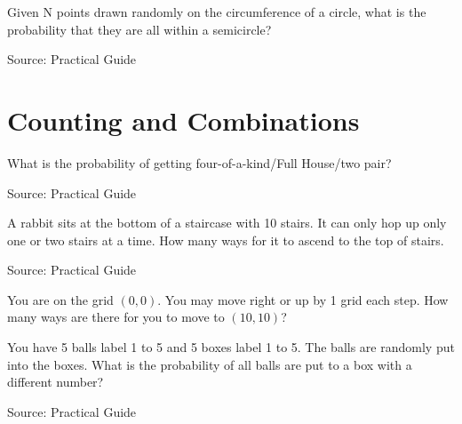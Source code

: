 \begin{exe}
Given N points drawn randomly on the circumference of a circle, what is the probability that they are all within a semicircle?
\end{exe}
Source: Practical Guide
\begin{teacher}
\begin{sol}
\end{sol}
\end{teacher}

\section{Counting and Combinations}
\begin{exe}
What is the probability of getting four-of-a-kind/Full House/two pair?
\end{exe}
Source: Practical Guide
\begin{teacher}
\begin{sol}
\end{sol}
\end{teacher}

\begin{exe}
A rabbit sits at the bottom of a staircase with 10 stairs. It can only hop up only one or two stairs at a time. How many ways for it to ascend to the top of stairs.
\end{exe}
Source: Practical Guide
\begin{teacher}
\begin{sol}
\end{sol}
\end{teacher}

\begin{exe}
You are on the grid $(0, 0)$. You may move right or up by 1 grid each step. How many ways are there for you to move to $(10, 10)$?
\end{exe}
\begin{teacher}
\begin{sol}
\end{sol}
\end{teacher}

\begin{exe}
You have 5 balls label 1 to 5 and 5 boxes label 1 to 5. The balls are randomly put into the boxes. What is the probability of all balls are put to a box with a different number?
\end{exe}
Source: Practical Guide
\begin{teacher}
\begin{sol}
\end{sol}
\end{teacher}

